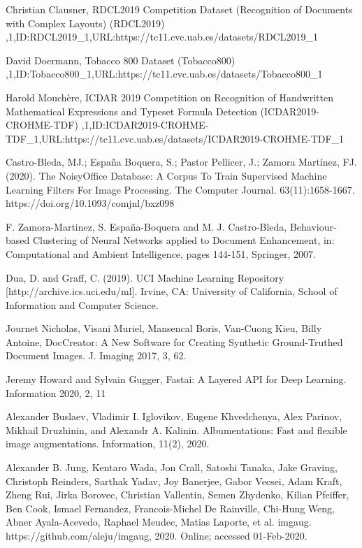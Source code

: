\documentclass[runningheads]{llncs}
\begin{document}
%
%
%
% 
% 
%
\begin{thebibliography}{8}
{Christian Clausner, RDCL2019 Competition Dataset (Recognition of Documents with Complex Layouts) (RDCL2019) ,1,ID:RDCL2019\_1,URL:https://tc11.cvc.uab.es/datasets/RDCL2019_1}

{David Doermann, Tobacco 800 Dataset (Tobacco800) ,1,ID:Tobacco800_1,URL:https://tc11.cvc.uab.es/datasets/Tobacco800_1}

{Harold Mouchère, ICDAR 2019 Competition on Recognition of Handwritten Mathematical Expressions and Typeset Formula Detection (ICDAR2019-CROHME-TDF) ,1,ID:ICDAR2019-CROHME-TDF\_1,URL:https://tc11.cvc.uab.es/datasets/ICDAR2019-CROHME-TDF_1}

{Castro-Bleda, MJ.; España Boquera, S.; Pastor Pellicer, J.; Zamora Martínez, FJ. (2020). The NoisyOffice Database: A Corpus To Train Supervised Machine Learning Filters For Image Processing. The Computer Journal. 63(11):1658-1667. https://doi.org/10.1093/comjnl/bxz098}

{F. Zamora-Martinez, S. España-Boquera and M. J. Castro-Bleda, Behaviour-based Clustering of Neural Networks applied to Document Enhancement, in: Computational and Ambient Intelligence, pages 144-151, Springer, 2007.}

{Dua, D. and Graff, C. (2019). UCI Machine Learning Repository [http://archive.ics.uci.edu/ml]. Irvine, CA: University of California, School of Information and Computer Science.}

  {Journet Nicholas, Visani Muriel, Mansencal Boris, Van-Cuong Kieu, Billy Antoine, DocCreator: A New Software for Creating Synthetic Ground-Truthed Document Images. J. Imaging 2017, 3, 62.}

{Jeremy Howard and Sylvain Gugger, Fastai: A Layered API for Deep Learning. Information 2020, 2, 11}

{Alexander Buslaev, Vladimir I. Iglovikov, Eugene Khvedchenya, Alex Parinov, Mikhail Druzhinin, and Alexandr A. Kalinin. Albumentations: Fast and flexible image augmentations. Information, 11(2), 2020.}

  {Alexander B. Jung, Kentaro Wada, Jon Crall, Satoshi Tanaka, Jake Graving, Christoph Reinders, Sarthak Yadav, Joy Banerjee, Gabor Vecsei, Adam Kraft, Zheng Rui, Jirka Borovec, Christian Vallentin, Semen Zhydenko, Kilian Pfeiffer, Ben Cook, Ismael Fernandez, Francois-Michel De Rainville, Chi-Hung Weng, Abner Ayala-Acevedo, Raphael Meudec, Matias Laporte, et al. imgaug. https://github.com/aleju/imgaug, 2020. Online; accessed 01-Feb-2020.}
\end{thebibliography}
\end{document}
